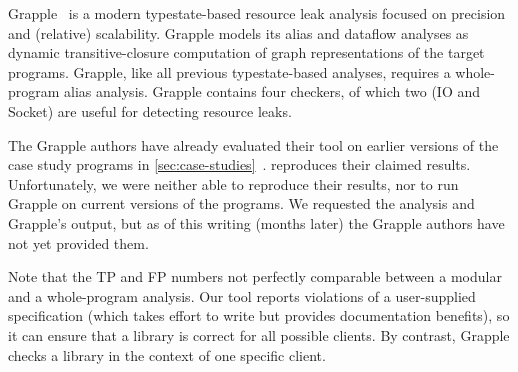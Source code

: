 Grapple~\cite{zuo2019grapple} is a modern typestate-based resource leak analysis
focused on precision and (relative) scalability. Grapple models its alias and
dataflow analyses as dynamic transitive-closure computation of graph
representations of the target programs. Grapple, like all previous
typestate-based analyses, requires a whole-program alias analysis. Grapple
contains four checkers, of which two (IO and Socket) are useful for detecting
resource leaks.

The Grapple authors have already evaluated their tool on earlier
versions
 of the case study programs in
\cref{sec:case-studies}~\cite{zuo2019grapple}.
 reproduces their claimed results.
Unfortunately, we were
neither able to reproduce their results, nor to run Grapple on current
versions of the programs.
We requested the analysis and Grapple's output, but as of this writing
(months later) the Grapple authors have not yet provided them.

Note that the TP and FP numbers not perfectly comparable between a modular
and a whole-program analysis.
Our tool reports violations of a user-supplied specification
(which takes effort to write but provides documentation benefits), so it
can ensure that a library is correct for all possible clients.  By
contrast, Grapple checks a library in the context of one specific client.

